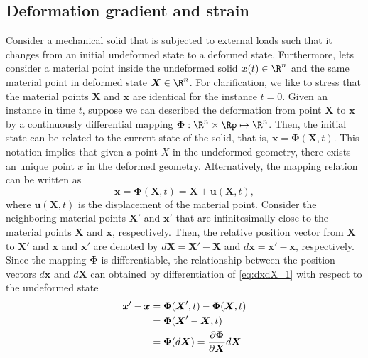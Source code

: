 \subsection{Deformation gradient and strain}
 Consider a mechanical solid that is subjected to external loads such that it changes from an initial undeformed state to a deformed state. Furthermore, lets consider a material point inside the undeformed solid $\boldsymbol{x}(t) \in \R^n$ and the same material point in deformed state $\boldsymbol{X} \in \R^n$. For clarification, we like to stress that the material points $\boldsymbol{X}$ and $\boldsymbol{x}$ are identical for the instance $t = 0$. Given an instance in time $t$, suppose we can described the deformation from point $\boldsymbol{X}$ to $\boldsymbol{x}$ by a continuously differential mapping $\boldsymbol{\Phi} : \R^n \times \Rp \mapsto \R^n$. Then, the initial state can be related to the current state of the solid, that is, $\boldsymbol{x} = \boldsymbol{\Phi}(\boldsymbol{X},t)$. This notation implies that given a point $X$ in the undeformed geometry, there exists an unique point $x$ in the deformed geometry. Alternatively, the mapping relation can be written as
 \begin{equation}
 	\boldsymbol{x} = \boldsymbol{\Phi}(\boldsymbol{X},t) = \boldsymbol{X} +\boldsymbol{u}(\boldsymbol{X},t), \label{eq:dxdX_1}
 \end{equation}
 where $\boldsymbol{u}(\boldsymbol{X},t)$ is the displacement of the material point. Consider the neighboring material points $\boldsymbol{X}'$ and $\boldsymbol{x}'$ that are infinitesimally close to the material points $\boldsymbol{X}$ and $\boldsymbol{x}$, respectively. Then, the relative position vector from $\boldsymbol{X}$ to $\boldsymbol{X}'$ and $\boldsymbol{x}$ and $\boldsymbol{x}'$ are denoted by $d \boldsymbol{X} = \boldsymbol{X}' - \boldsymbol{X}$ and $d \boldsymbol{x} = \boldsymbol{x}' - \boldsymbol{x}$, respectively. Since the mapping $\boldsymbol{\Phi}$ is differentiable, the relationship between the position vectors $d \boldsymbol{x}$ and $d \boldsymbol{X}$ can obtained by differentiation of \eqref{eq:dxdX_1} with respect to the undeformed state 
 \begin{align} 
\boldsymbol{x}' - \boldsymbol{x} & = \boldsymbol{\Phi}(\boldsymbol{X}',t) - \boldsymbol{\Phi}(\boldsymbol{X},t) \notag\\ 
 & = \boldsymbol{\Phi}(\boldsymbol{X}' - \boldsymbol{X},t) \notag \\
 & = \boldsymbol{\Phi}(d\boldsymbol{X}) = \frac{\partial \boldsymbol{\Phi}}{\partial \boldsymbol{X}} d\boldsymbol{X} 
 \end{align}
